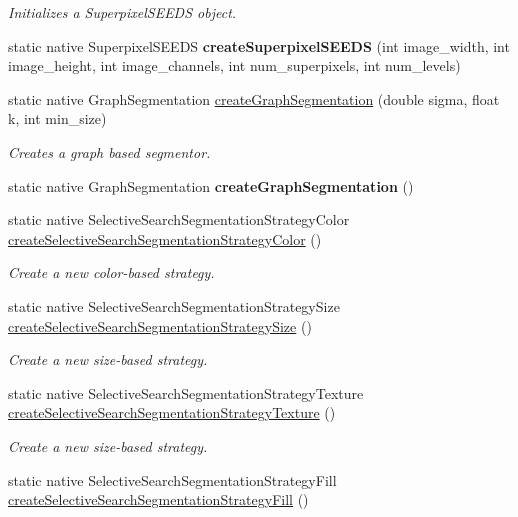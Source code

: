 \begin{DoxyCompactItemize}
\begin{DoxyCompactList}\small\item\em Initializes a Superpixel\+S\+E\+E\+DS object. \end{DoxyCompactList}\item 
static native Superpixel\+S\+E\+E\+DS {\bfseries create\+Superpixel\+S\+E\+E\+DS} (int image\+\_\+width, int image\+\_\+height, int image\+\_\+channels, int num\+\_\+superpixels, int num\+\_\+levels)
\item 
static native Graph\+Segmentation \hyperlink{group__ximgproc__segmentation_ga51469520253d4dc38fd411763692c452}{create\+Graph\+Segmentation} (double sigma, float k, int min\+\_\+size)
\begin{DoxyCompactList}\small\item\em Creates a graph based segmentor. \end{DoxyCompactList}\item 
static native Graph\+Segmentation {\bfseries create\+Graph\+Segmentation} ()
\item 
static native Selective\+Search\+Segmentation\+Strategy\+Color \hyperlink{group__ximgproc__segmentation_ga9631bc8096ead6133e098623d8f1e664}{create\+Selective\+Search\+Segmentation\+Strategy\+Color} ()
\begin{DoxyCompactList}\small\item\em Create a new color-\/based strategy. \end{DoxyCompactList}\item 
static native Selective\+Search\+Segmentation\+Strategy\+Size \hyperlink{group__ximgproc__segmentation_gabe5aa072443fd8b40ea54141bd3628b7}{create\+Selective\+Search\+Segmentation\+Strategy\+Size} ()
\begin{DoxyCompactList}\small\item\em Create a new size-\/based strategy. \end{DoxyCompactList}\item 
static native Selective\+Search\+Segmentation\+Strategy\+Texture \hyperlink{group__ximgproc__segmentation_ga921f1030601ebcdad67662f016ebb6bf}{create\+Selective\+Search\+Segmentation\+Strategy\+Texture} ()
\begin{DoxyCompactList}\small\item\em Create a new size-\/based strategy. \end{DoxyCompactList}\item 
static native Selective\+Search\+Segmentation\+Strategy\+Fill \hyperlink{group__ximgproc__segmentation_ga6615570ea96beef3412287b4dddb312a}{create\+Selective\+Search\+Segmentation\+Strategy\+Fill} ()

\end{DoxyCompactItemize}
